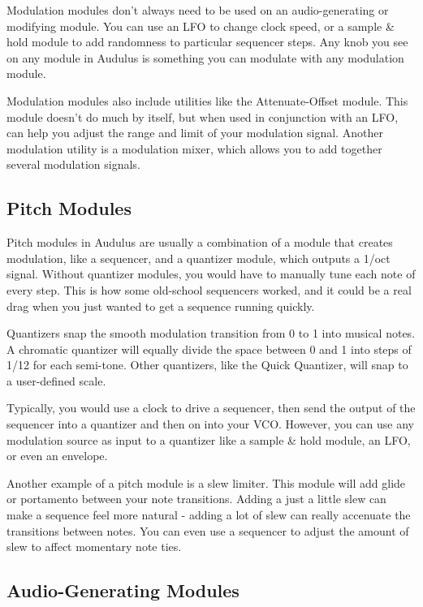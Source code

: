 \documentclass[11pt]{book}
\begin{document}
Modulation modules don't always need to be used on an audio-generating or modifying module. You can use an LFO to change clock speed, or a sample \& hold module to add randomness to particular sequencer steps. Any knob you see on any module in Audulus is something you can modulate with any modulation module. 

Modulation modules also include utilities like the Attenuate-Offset module. This module doesn't do much by itself, but when used in conjunction with an LFO, can help you adjust the range and limit of your modulation signal. Another modulation utility is a modulation mixer, which allows you to add together several modulation signals.

\subsection{Pitch Modules}

Pitch modules in Audulus are usually a combination of a module that creates modulation, like a sequencer, and a quantizer module, which outputs a 1/oct signal. Without quantizer modules, you would have to manually tune each note of every step. This is how some old-school sequencers worked, and it could be a real drag when you just wanted to get a sequence running quickly.

Quantizers snap the smooth modulation transition from 0 to 1 into musical notes. A chromatic quantizer will equally divide the space between 0 and 1 into steps of 1/12 for each semi-tone. Other quantizers, like the Quick Quantizer, will snap to a user-defined scale.

Typically, you would use a clock to drive a sequencer, then send the output of the sequencer into a quantizer and then on into your VCO. However, you can use any modulation source as input to a quantizer like a sample \& hold module, an LFO, or even an envelope.

Another example of a pitch module is a slew limiter. This module will add glide or portamento between your note transitions. Adding a just a little slew can make a sequence feel more natural - adding a lot of slew can really accenuate the transitions between notes. You can even use a sequencer to adjust the amount of slew to affect momentary note ties.

\subsection{Audio-Generating Modules}
\end{document}
